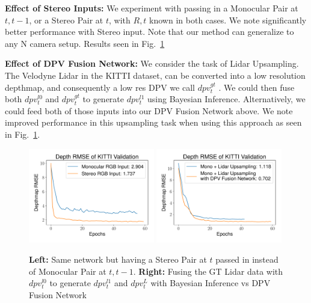 \textbf{Effect of Stereo Inputs:} We experiment with passing in a Monocular Pair at $t, t-1$, or a Stereo Pair at $t$, with $R,t$ known in both cases. We note significantly better performance with Stereo input. Note that our method can generalize to any N camera setup. Results seen in Fig.~\ref{fig:stereodpv}

\textbf{Effect of DPV Fusion Network:} We consider the task of Lidar Upsampling. The Velodyne Lidar in the KITTI dataset, can be converted into a low resolution depthmap, and consequently a low res DPV we call $dpv_{t}^{gt}$ . We could then fuse both $dpv_{t}^{l0}$ and $dpv_{t}^{gt}$ to generate $dpv_{t}^{l1}$ using Bayesian Inference. Alternatively, we could feed both of those inputs into our DPV Fusion Network above. We note improved performance in this upsampling task when using this approach as seen in Fig.~\ref{fig:stereodpv}. 

\begin{figure}[H]
   \centering
   \begin{minipage}{0.5\textwidth}
       \centering
       \includegraphics[width=0.49\textwidth]{figures/Figure_7.pdf}
       \includegraphics[width=0.49\textwidth]{figures/Figure_6.pdf}
   \end{minipage}\hfill
   \centering
   \caption{ \textbf{Left:} Same network but having a Stereo Pair at $t$ passed in instead of Monocular Pair at $t, t-1$. \textbf{Right:} Fusing the GT Lidar data with $dpv_{t}^{l0}$ to generate $dpv_{t}^{l1}$ and $dpv_{t}^{L}$ with Bayesian Inference vs DPV Fusion Network}
   \label{fig:stereodpv} 
\end{figure}

